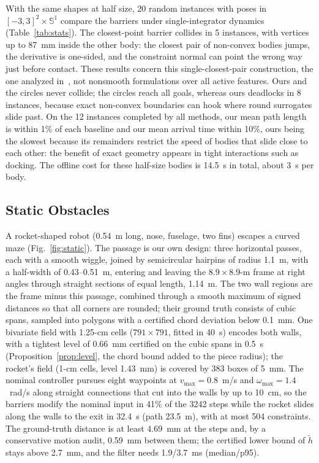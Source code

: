 \documentclass[journal]{IEEEtran}
\theoremstyle{definition}
\newcommand{\Sone}{\mathbb{S}^1}
\begin{document}
With the same shapes at half size, 20 random instances with poses in $[-3,3]^2\times\Sone$ compare
the barriers under single-integrator dynamics (Table~\ref{tab:stats}). The closest-point barrier
collides in 5 instances, with vertices up to 87~mm inside the other body: the closest pair of
non-convex bodies jumps, the derivative is one-sided, and the constraint normal can point the wrong
way just before contact. These results concern this single-closest-pair construction, the one
analyzed in~\cite{jo2026geometry}, not nonsmooth formulations over all active features. Ours and the
circles never collide; the circles reach all goals, whereas ours deadlocks in 8 instances, because
exact non-convex boundaries can hook where round surrogates slide past. On the 12 instances completed
by all methods, our mean path length is within 1\% of each baseline and our mean arrival time
within 10\%, ours being the
slowest because its remainders restrict the speed of bodies that slide close to each other: the
benefit of exact geometry appears in tight interactions such as docking. The offline cost for these
half-size bodies is 14.5~s in total, about 3~s per body.

\subsection{Static Obstacles}\label{sec:exp-static}
A rocket-shaped robot (0.54~m long, nose, fuselage, two fins) escapes a curved maze (Fig.~\ref{fig:static}). The passage is our own design: three horizontal passes,
each with a smooth wiggle, joined by semicircular hairpins of radius 1.1~m, with a half-width of
0.43--0.51~m, entering and leaving the $8.9\times8.9$-m frame at right angles through straight
sections of equal length, 1.14~m. The two wall regions
are the frame minus this passage, combined through a smooth maximum of signed distances so that all
corners are rounded; their ground truth consists of cubic spans, sampled into polygons with a
certified chord deviation below 0.1~mm. One bivariate field with 1.25-cm cells ($791\times791$, fitted in 40~s) encodes both walls, with a
tightest level of 0.66~mm certified on the cubic spans in 0.5~s (Proposition~\ref{prop:level}, the
chord bound added to the piece radius); the rocket's field (1-cm cells, level 1.43~mm) is covered by
383 boxes of 5~mm. The nominal controller pursues eight waypoints at $v_{\max}=0.8$~m/s and
$\omega_{\max}=1.4$~rad/s along straight connections that cut into the walls by up to 10~cm, so the
barriers modify the nominal input in 41\% of the 3242 steps while the rocket slides along the walls to
the exit in 32.4~s (path 23.5~m), with at most 504 constraints. The ground-truth distance is at least
4.69~mm at the steps and, by a conservative motion audit, 0.59~mm between them; the certified lower
bound of $\tilde h$ stays above 2.7~mm, and the filter needs 1.9/3.7~ms (median/p95).
\end{document}
